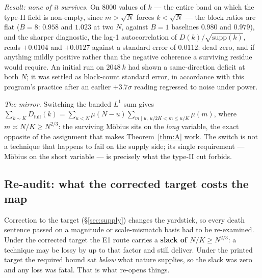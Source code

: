 \documentclass[11pt,a4paper]{article}
\theoremstyle{plain}
\theoremstyle{definition}
\begin{document}
\emph{Result: none of it survives.} On $8000$ values of $k$ --- the
entire band on which the type-II field is non-empty, since
$m > \sqrt N$ forces $k < \sqrt N$ --- the block ratios are flat
($B=8$: $0.958$ and $1.023$ at two $N$, against $B=1$ baselines
$0.980$ and $0.979$), and the sharper diagnostic, the lag-1
autocorrelation of $D(k)/\sqrt{\mathrm{supp}(k)}$, reads
$+0.0104$ and $+0.0127$ against a standard error of $0.0112$: dead
zero, and if anything mildly positive rather than the negative
coherence a surviving residue would require. An initial run on
$2048\ k$ had shown a same-direction deficit at both $N$; it was
settled as block-count standard error, in accordance with this
program's practice after an earlier $+3.7\sigma$ reading regressed to
noise under power.

\emph{The mirror.} Switching the banded $L^1$ sum gives
$\sum_{k\sim K}D_{\text{full}}(k)
 = \sum_{u<N}\mu(N-u)\sum_{m\mid u,\ u/2K<m\le u/K}\mu(m)$, where
$m \asymp N/K \ge N^{2/3}$: the surviving M\"obius sits on the
\emph{long} variable, the exact opposite of the assignment that makes
Theorem~\ref{thm:A} work. The switch is not a technique that happens
to fail on the supply side; its single requirement --- M\"obius on the
short variable --- is precisely what the type-II cut forbids.

\subsection{Re-audit: what the corrected target costs the map}
\label{sec:reaudit}

Correction to the target (\S\ref{sec:supply}) changes the yardstick,
so every death sentence passed on a magnitude or scale-mismatch basis
had to be re-examined. Under the corrected target the E1 route carries
a \textbf{slack of $N/K \ge N^{2/3}$}: a technique may be lossy by up
to that factor and still deliver. Under the printed target the
required bound sat \emph{below} what nature supplies, so the slack was
zero and any loss was fatal. That is what re-opens things.
\end{document}
